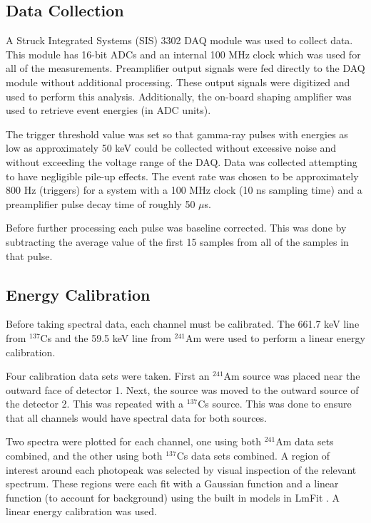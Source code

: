 \subsection*{Data Collection}

A Struck Integrated Systems (SIS) 3302 DAQ module was used to collect data. This module has 16-bit ADCs and an internal 100 MHz clock which was used for all of the measurements. Preamplifier output signals were fed directly to the DAQ module without additional processing. These output signals were digitized and used to perform this analysis. Additionally, the on-board shaping amplifier was used to retrieve event energies (in ADC units).

The trigger threshold value was set so that gamma-ray pulses with energies as low as approximately 50 keV could be collected without excessive noise and without exceeding the voltage range of the DAQ. Data was collected attempting to have negligible pile-up effects. The event rate was chosen to be approximately 800 Hz (triggers) for a system with a 100 MHz clock (10 ns sampling time) and a preamplifier pulse decay time of roughly 50 $\mu$s.

Before further processing each pulse was baseline corrected. This was done by subtracting the average value of the first 15 samples from all of the samples in that pulse.

\subsection*{Energy Calibration}

Before taking spectral data, each channel must be calibrated. The 661.7 keV line from ${}^{137}$Cs and the 59.5 keV line from ${}^{241}$Am were used to perform a linear energy calibration.

Four calibration data sets were taken. First an ${}^{241}$Am source was placed near the outward face of detector 1. Next, the source was moved to the outward source of the detector 2. This was repeated with a ${}^{137}$Cs source. This was done to ensure that all channels would have spectral data for both sources.

Two spectra were plotted for each channel, one using both ${}^{241}$Am data sets combined, and the other using both ${}^{137}$Cs data sets combined. A region of interest around each photopeak was selected by visual inspection of the relevant spectrum. These regions were each fit with a Gaussian function and a linear function (to account for background) using the built in models in LmFit \cite{LMFIT}. A linear energy calibration was used.

